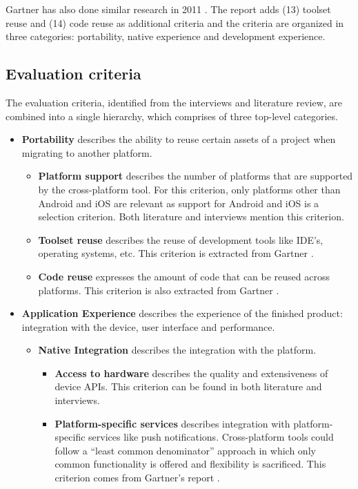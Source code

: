 Gartner has also done similar research in 2011 \cite{Gartner:CPT:2011}. The report adds (13) toolset reuse and (14) code reuse as additional criteria and the criteria are organized in three categories: portability, native experience and development experience.

\subsection{Evaluation criteria}

The evaluation criteria, identified from the interviews and literature review, are combined into a single hierarchy, which comprises of three top-level categories.

\begin{itemize}
    \item \textbf{Portability} describes the ability to reuse certain assets of a project when migrating to another platform.
    \begin{itemize}
        \item \textbf{Platform support} describes the number of platforms that are supported by the cross-platform tool. For this criterion, only platforms other than Android and iOS are relevant as support for Android and iOS is a selection criterion. Both literature \cite{Gartner:CPT:2011, VMCPT:2012} and interviews mention this criterion.
        \item \textbf{Toolset reuse} describes the reuse of development tools like IDE's, operating systems, etc. This criterion is extracted from Gartner \cite{Gartner:CPT:2011}.
        \item \textbf{Code reuse} expresses the amount of code that can be reused across platforms. This criterion is also extracted from Gartner \cite{Gartner:CPT:2011}.
    \end{itemize}
    \item \textbf{Application Experience} describes the experience of the finished product: integration with the device, user interface and performance. 
    \begin{itemize}
        \item \textbf{Native Integration} describes the integration with the platform.
        \begin{itemize}
            \item \textbf{Access to hardware} describes the quality and extensiveness of device APIs. This criterion can be found in both literature and interviews.
            \item \textbf{Platform-specific services} describes integration with platform-specific services like push notifications. Cross-platform tools could follow a ``least common denominator'' approach in which only common functionality is offered and flexibility is sacrificed. This criterion comes from Gartner's report \cite{Gartner:CPT:2011}.

\end{itemize}
\end{itemize}
\end{itemize}
